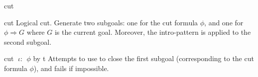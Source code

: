 \begin{tactic}{cut}
  \begin{tsyntax}[empty]{cut}
  Logical cut. Generate two subgoals: one for the cut formula $\phi$,
  and one for $\phi \Rightarrow G$ where $G$ is the current goal. Moreover,
  the intro-pattern \ec{$\iota$} is applied to the second subgoal.
  \end{tsyntax}

  \begin{tsyntax}{cut $\;\iota$: $\;\phi$ by t}
  Attempts to use  to close the first subgoal (corresponding to
  the cut formula $\phi$), and fails if impossible.
  \end{tsyntax}
\end{tactic}
